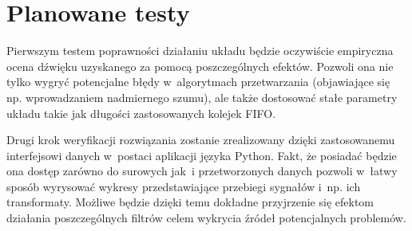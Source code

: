 
\section{Planowane testy}

Pierwszym testem poprawności działaniu układu będzie oczywiście empiryczna ocena dźwięku uzyskanego za pomocą poszczególnych efektów. Pozwoli ona nie tylko wygryć potencjalne błędy w~algorytmach przetwarzania (objawiające się np. wprowadzaniem nadmiernego szumu), ale także dostosować stałe parametry układu takie jak długości zastosowanych kolejek FIFO. 

Drugi krok weryfikacji rozwiązania zostanie zrealizowany dzięki zastosowanemu interfejsowi danych w~postaci aplikacji języka Python. Fakt, że posiadać będzie ona dostęp zarówno do surowych jak~i przetworzonych danych pozwoli w~łatwy sposób wyrysować wykresy przedstawiające przebiegi sygnałów i~np. ich transformaty. Możliwe będzie dzięki temu dokładne przyjrzenie się efektom działania poszczególnych filtrów celem wykrycia źródeł potencjalnych problemów. 
